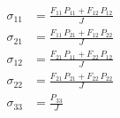 \begin{align}
\sigma_{11} &= \frac{F_{11}\,P_{11}+F_{12}\,P_{12}}{J} \\ 
\sigma_{21} &= \frac{F_{11}\,P_{21}+F_{12}\,P_{22}}{J} \\ 
\sigma_{12} &= \frac{F_{21}\,P_{11}+F_{22}\,P_{12}}{J} \\ 
\sigma_{22} &= \frac{F_{21}\,P_{21}+F_{22}\,P_{22}}{J} \\ 
\sigma_{33} &= \frac{P_{33}}{J} 
\end{align}
